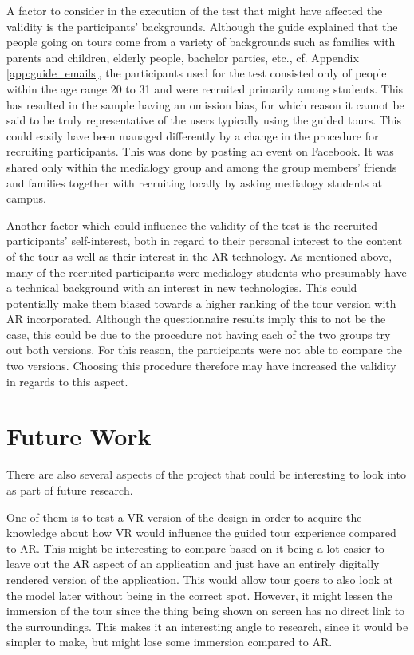 A factor to consider in the execution of the test that might have affected the validity is the participants’ backgrounds. Although the guide explained that the people going on tours come from a variety of backgrounds such as families with parents and children, elderly people, bachelor parties, etc., cf. Appendix \ref{app:guide_emails}, the participants used for the test consisted only of people within the age range 20 to 31 and were recruited primarily among students. This has resulted in the sample having an omission bias, for which reason it cannot be said to be truly representative of the users typically using the guided tours. This could easily have been managed differently by a change in the procedure for recruiting participants. This was done by posting an event on Facebook. It was shared only within the medialogy group and among the group members’ friends and families together with recruiting locally by asking medialogy students at campus.

Another factor which could influence the validity of the test is the recruited participants’ self-interest, both in regard to their personal interest to the content of the tour as well as their interest in the AR technology. As mentioned above, many of the recruited participants were medialogy students who presumably have a technical background with an interest in new technologies. This could potentially make them biased towards a higher ranking of the tour version with AR incorporated. Although the questionnaire results imply this to not be the case, this could be due to the procedure not having each of the two groups try out both versions. For this reason, the participants were not able to compare the two versions. Choosing this procedure therefore may have increased the validity in regards to this aspect.  

\section{Future Work}
There are also several aspects of the project that could be interesting to look into as part of future research. 

One of them is to test a VR version of the design in order to acquire the knowledge about how VR would influence the guided tour experience compared to AR. This might be interesting to compare based on it being a lot easier to leave out the AR aspect of an application and just have an entirely digitally rendered version of the application. This would allow tour goers to also look at the model later without being in the correct spot. However, it might lessen the immersion of the tour since the thing being shown on screen has no direct link to the surroundings. This makes it an interesting angle to research, since it would be simpler to make, but might lose some immersion compared to AR. 

